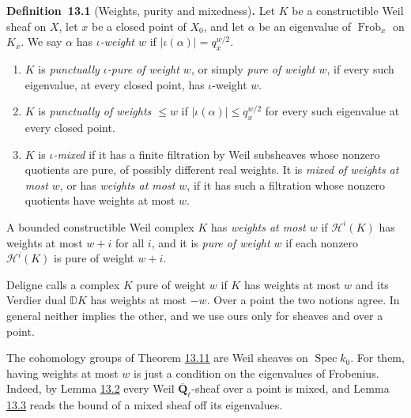 \documentclass[11pt]{article}
\newenvironment{bpstatement}[2]{\par\addvspace{0.6\baselineskip}\noindent\textbf{#1}#2\textbf{.}\enspace\ignorespaces}
  {\par\addvspace{0.4\baselineskip}}
\begin{document}
\label{bp9}%
\begin{bpstatement}{Definition~13.1}{ (Weights, purity and mixedness)}
Let \(K\) be a constructible Weil sheaf on \(X\), let \(x\) be a closed point of \(X_0\), and let \(\alpha\) be an eigenvalue of \(\operatorname{Frob}_x\) on \(K_{\bar x}\). We say \(\alpha\) has \emph{\(\iota\)-weight \(w\)} if \(|\iota(\alpha)|=q_x^{w/2}\).

\begin{enumerate}
\item \(K\) is \emph{punctually \(\iota\)-pure of weight \(w\)}, or simply \emph{pure of weight \(w\)}, if every such eigenvalue, at every closed point, has \(\iota\)-weight \(w\).
\item \(K\) is \emph{punctually of weights \(\le w\)} if \(|\iota(\alpha)|\le q_x^{w/2}\) for every such eigenvalue at every closed point.
\item \(K\) is \emph{\(\iota\)-mixed} if it has a finite filtration by Weil subsheaves whose nonzero quotients are pure, of possibly different real weights. It is \emph{mixed of weights at most \(w\)}, or has \emph{weights at most \(w\)}, if it has such a filtration whose nonzero quotients have weights at most \(w\).
\end{enumerate}

A bounded constructible Weil complex \(K\) has \emph{weights at most \(w\)} if \(\mathcal H^i(K)\) has weights at most \(w+i\) for all \(i\), and it is \emph{pure of weight \(w\)} if each nonzero \(\mathcal H^i(K)\) is pure of weight \(w+i\).
\end{bpstatement}

\label{bp10}%
Deligne calls a complex \(K\) pure of weight \(w\) if \(K\) has weights at most \(w\) and its Verdier dual \(\mathbb D K\) has weights at most \(-w\). Over a point the two notions agree. In general neither implies the other, and we use ours only for sheaves and over a point.

The cohomology groups of Theorem \hyperref[bp38]{13.11} are Weil sheaves on \(\operatorname{Spec}k_0\). For them, having weights at most \(w\) is just a condition on the eigenvalues of Frobenius. Indeed, by Lemma \hyperref[bp11]{13.2} every Weil \(\overline{\mathbf Q}_\ell\)-sheaf over a point is mixed, and Lemma \hyperref[bp14]{13.3} reads the bound of a mixed sheaf off its eigenvalues.
\end{document}
